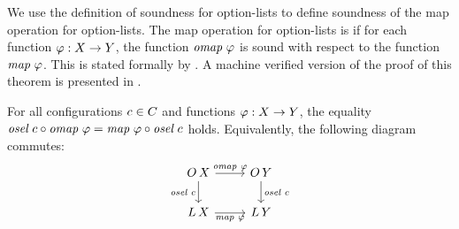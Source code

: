 We use the definition of soundness for option-lists to define soundness of the map operation for option-lists.
The map operation for option-lists is  if for each function $\varphi : \color{black}X \to \color{black}Y$, the function $\omap\ \varphi$ is sound with respect to the function $\color{black}\textit{map}\ \varphi$.
This is stated formally by .
A machine verified version of the proof of this theorem is presented in .

\begin{theorem}
  \label{thm:map}
  For all configurations $\color{black}c \in \color{black}C$ and functions $\varphi : \color{black}X \to \color{black}Y$, the equality
  $
    \color{black}\textit{osel}\ \color{black}c \circ \color{black}\textit{omap}\ \varphi =
    \color{black}\textit{map}\ \varphi \circ \color{black}\textit{osel}\ \color{black}c
  $
  holds.
  Equivalently, the following diagram commutes:
  $$
    \begin{tikzcd}
      \OLst \ar[d, "\osel\ \cE"'] \ar[r, "\omap\ \varphi"] &
      \OLst[\ValY] \ar[d, "\osel\ \cE"] \\
      \Lst \ar[r, "\lmap\ \varphi"'] &
      \Lst[\ValY]
    \end{tikzcd}
  $$
\end{theorem}


